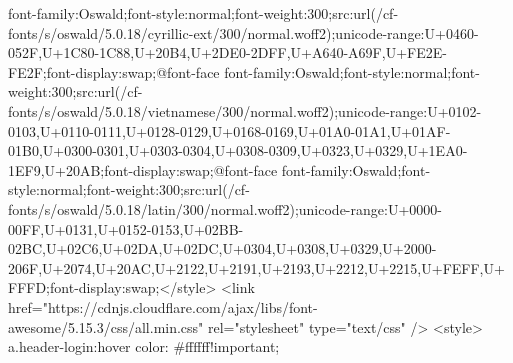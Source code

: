{font-family:Oswald;font-style:normal;font-weight:300;src:url(/cf-fonts/s/oswald/5.0.18/cyrillic-ext/300/normal.woff2);unicode-range:U+0460-052F,U+1C80-1C88,U+20B4,U+2DE0-2DFF,U+A640-A69F,U+FE2E-FE2F;font-display:swap;}@font-face {font-family:Oswald;font-style:normal;font-weight:300;src:url(/cf-fonts/s/oswald/5.0.18/vietnamese/300/normal.woff2);unicode-range:U+0102-0103,U+0110-0111,U+0128-0129,U+0168-0169,U+01A0-01A1,U+01AF-01B0,U+0300-0301,U+0303-0304,U+0308-0309,U+0323,U+0329,U+1EA0-1EF9,U+20AB;font-display:swap;}@font-face {font-family:Oswald;font-style:normal;font-weight:300;src:url(/cf-fonts/s/oswald/5.0.18/latin/300/normal.woff2);unicode-range:U+0000-00FF,U+0131,U+0152-0153,U+02BB-02BC,U+02C6,U+02DA,U+02DC,U+0304,U+0308,U+0329,U+2000-206F,U+2074,U+20AC,U+2122,U+2191,U+2193,U+2212,U+2215,U+FEFF,U+FFFD;font-display:swap;}</style>
<link href="https://cdnjs.cloudflare.com/ajax/libs/font-awesome/5.15.3/css/all.min.css" rel="stylesheet" type="text/css" />
<style>
        a.header-login:hover{
            color: #ffffff!important;
        }


